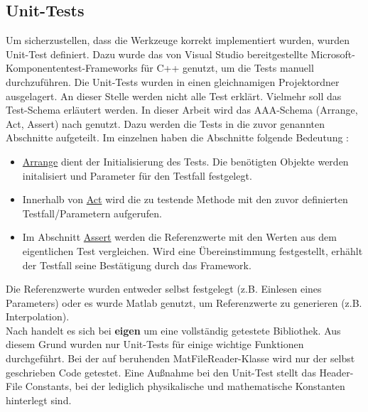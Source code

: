 \subsection{Unit-Tests}
Um sicherzustellen, dass die Werkzeuge korrekt implementiert wurden, wurden Unit-Test definiert. Dazu wurde das von Visual Studio bereitgestellte Microsoft-Komponententest-Frameworks für C++ genutzt, um die Tests manuell durchzuführen. Die Unit-Tests wurden in einen gleichnamigen Projektordner ausgelagert. An dieser Stelle werden nicht alle Test erklärt. Vielmehr soll das Test-Schema erläutert werden. In dieser Arbeit wird das AAA-Schema  (Arrange, Act, Assert) nach \cite{Microsoft.2018}  genutzt. Dazu werden die Tests in die zuvor genannten Abschnitte aufgeteilt. Im einzelnen haben die Abschnitte folgende Bedeutung \cite{Microsoft.2018}: 
\begin{itemize}
	\item  \underline{Arrange} dient der Initialisierung des Tests. Die benötigten Objekte werden initalisiert und Parameter für den Testfall festgelegt.   
	
	\item  Innerhalb von \underline{Act} wird die zu testende Methode mit den zuvor definierten Testfall/Parametern aufgerufen.
	
	\item Im Abschnitt \underline{Assert} werden die Referenzwerte mit den Werten aus dem eigentlichen Test vergleichen. Wird eine Übereinstimmung festgestellt, erhählt der Testfall seine Bestätigung durch das Framework.
\end{itemize}
Die Referenzwerte wurden entweder selbst festgelegt (z.B. Einlesen eines Parameters) oder es wurde Matlab genutzt, um Referenzwerte zu generieren (z.B. Interpolation). \\
Nach \cite{TuxFamily.2018} handelt es sich bei \textbf{eigen} um eine vollständig getestete Bibliothek. Aus diesem Grund wurden nur Unit-Tests für einige wichtige Funktionen durchgeführt. Bei der auf \cite{Hulbert.2013} beruhenden MatFileReader-Klasse wird nur der selbst geschrieben Code getestet. Eine Außnahme bei den Unit-Test stellt das Header-File Constants, bei der lediglich physikalische und mathematische Konstanten hinterlegt sind. 

